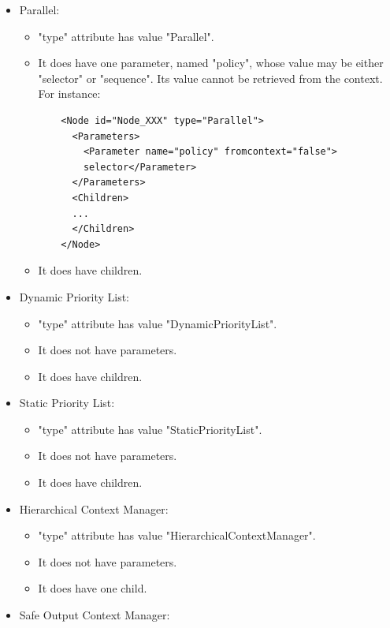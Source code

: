 \documentclass[a4paper,10pt]{article}
\begin{document}
\begin{itemize}
\item Parallel:

  \begin{itemize}
  \item "type" attribute has value "Parallel".
  \item It does have one parameter, named "policy", whose value may be either "selector" or "sequence". Its value cannot be retrieved from the context. For instance:
    \begin{verbatim}
    <Node id="Node_XXX" type="Parallel">
      <Parameters>
        <Parameter name="policy" fromcontext="false">
        selector</Parameter>
      </Parameters>
      <Children>
      ...
      </Children>
    </Node>
    \end{verbatim}
  \item It does have children.
  \end{itemize}

\item Dynamic Priority List:

  \begin{itemize}
  \item "type" attribute has value "DynamicPriorityList".
  \item It does not have parameters.
  \item It does have children.
  \end{itemize}
  
\item Static Priority List:

  \begin{itemize}
  \item "type" attribute has value "StaticPriorityList".
  \item It does not have parameters.
  \item It does have children.
  \end{itemize}

\item Hierarchical Context Manager:

  \begin{itemize}
  \item "type" attribute has value "HierarchicalContextManager".
  \item It does not have parameters.
  \item It does have one child.
  \end{itemize}

\item Safe Output Context Manager:


\end{itemize}
\end{document}
